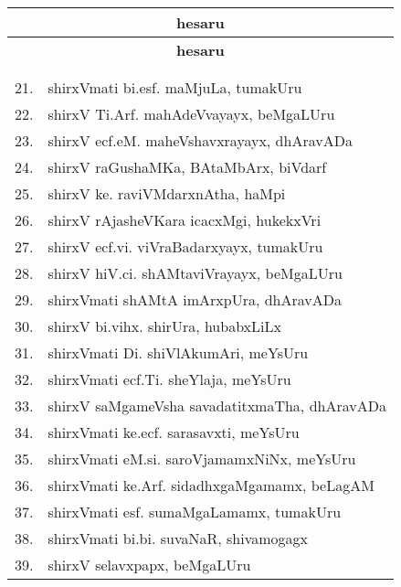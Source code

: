 \begin{center}
\begin{minipage}[t]{7cm}
\end{minipage}
\qquad\quad
\begin{minipage}[t]{7cm}
{\renewcommand{\arraystretch}{1.5}
\begin{longtable}{rl}
\hline
\multicolumn{2}{c}{\bf hesaru}\\[3pt]
\hline
\endfirsthead
\hline
\multicolumn{2}{c}{\bf hesaru}\\[3pt]
\hline
  & \\[-10pt]
\endhead
\endfoot
\endlastfoot
  & \\[-10pt]
21. & shirxVmati bi.esf. maMjuLa, tumakUru\\
22. & shirxV Ti.Arf. mahAdeVvayayx, beMgaLUru\\
23. & shirxV ecf.eM. maheVshavxrayayx, dhAravADa\\
24. & shirxV raGushaMKa, BAtaMbArx, biVdarf\\
25. & shirxV ke. raviVMdarxnAtha, haMpi\\
26. & shirxV rAjasheVKara icacxMgi, hukekxVri\\
27. & shirxV ecf.vi. viVraBadarxyayx, tumakUru\\
28. & shirxV hiV.ci. shAMtaviVrayayx, beMgaLUru\\
29. & shirxVmati shAMtA imArxpUra, dhAravADa\\
30. & shirxV bi.vihx. shirUra, hubabxLiLx\\
31. & shirxVmati Di. shiVlAkumAri, meYsUru\\
32. & shirxVmati ecf.Ti. sheYlaja, meYsUru\\
33. & shirxV saMgameVsha savadatitxmaTha, dhAravADa\\
34. & shirxVmati ke.ecf. sarasavxti, meYsUru\\
35. & shirxVmati eM.si. saroVjamamxNiNx, meYsUru\\
36. & shirxVmati ke.Arf. sidadhxgaMgamamx, beLagAM\\
37. & shirxVmati esf. sumaMgaLamamx, tumakUru\\
38. & shirxVmati bi.bi. suvaNaR, shivamogagx\\
39. &  shirxV selavxpapx, beMgaLUru\\
\end{longtable}}
\end{minipage}
\end{center}
